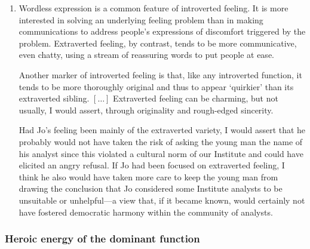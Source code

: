 \begin{enumerate}

\item {} Wordless expression is a common feature
of introverted feeling. It is more interested in solving an underlying feeling
problem than in making communications to address people’s expressions of
discomfort triggered by the problem. Extraverted feeling, by contrast, tends to
be more communicative, even chatty, using a stream of reassuring words to put
people at ease.

Another marker of introverted feeling is that, like any introverted function,
it tends to be more thoroughly original and thus to appear ‘quirkier’ than its
extraverted sibling. $[\ldots]$ Extraverted feeling can be charming, but not
usually, I would assert, through originality and rough-edged sincerity.

Had Jo's feeling been mainly of the extraverted variety, I would assert that he
probably would not have taken the risk of asking the young man the name of his
analyst since this violated a cultural norm of our Institute and could have
elicited an angry refusal. If Jo had been focused on extraverted feeling, I
think he also would have taken more care to keep the young man from drawing the
conclusion that Jo considered some Institute analysts to be unsuitable or
unhelpful—a view that, if it became known, would certainly not have fostered
democratic harmony within the community of analysts.

\end{enumerate}

\subsubsection{Heroic energy of the dominant function}

